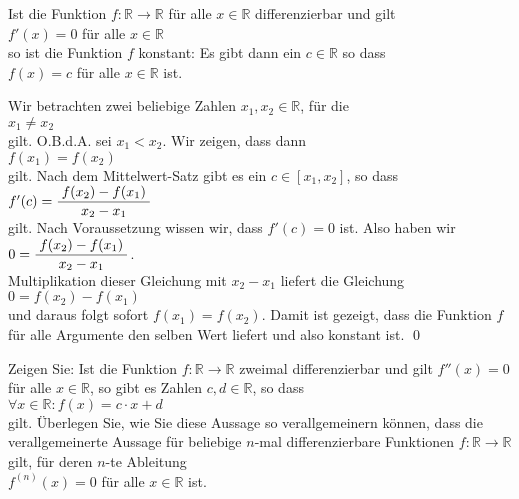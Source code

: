 \begin{Lemma} \label{lemma:0_ableitung}
Ist die Funktion $f:\mathbb{R} \rightarrow \mathbb{R}$ f\"ur alle $x \in \mathbb{R}$
differenzierbar und gilt
\\[0.2cm]
\hspace*{1.3cm}
$f'(x) = 0$ \quad f\"ur alle $x \in \mathbb{R}$
\\[0.2cm]
so ist die Funktion $f$ konstant:  Es gibt dann ein $c \in \mathbb{R}$ so dass
\\[0.2cm]
\hspace*{1.3cm}
$f(x) = c$ \quad f\"ur alle $x \in \mathbb{R}$ ist.
\end{Lemma}

\proof
Wir betrachten zwei beliebige Zahlen $x_1, x_2\in \mathbb{R}$, f\"ur die
\\[0.2cm]
\hspace*{1.3cm}
$x_1 \not= x_2$ 
\\[0.2cm]
gilt.  O.B.d.A. sei $x_1 < x_2$.  Wir zeigen, dass dann 
\\[0.2cm]
\hspace*{1.3cm}
$f(x_1) = f(x_2)$
\\[0.2cm]
gilt.  Nach dem Mittelwert-Satz gibt es ein $c \in [x_1,x_2]$, so dass
\\[0.2cm]
\hspace*{1.3cm}
$f'(c) = \displaystyle\frac{\;\displaystyle f(x_2) - f(x_1)\;}{\;\displaystyle x_2 - x_1\;}$ 
\\[0.2cm]
gilt.  Nach Voraussetzung wissen wir, dass $f'(c) = 0$ ist.  Also haben wir
\\[0.2cm]
\hspace*{1.3cm}
$0 = \displaystyle\frac{\;\displaystyle f(x_2) - f(x_1)\;}{\;\displaystyle x_2 - x_1\;}$.
\\[0.2cm]
Multiplikation dieser Gleichung mit $x_2 - x_1$ liefert die Gleichung
\\[0.2cm]
\hspace*{1.3cm}
$0 = f(x_2) - f(x_1)$
\\[0.2cm]
und daraus folgt sofort $f(x_1) = f(x_2)$.  Damit ist gezeigt, dass die Funktion $f$ f\"ur alle
Argumente den selben Wert liefert und also konstant ist. \qed

\exercise
Zeigen Sie: Ist die Funktion $f:\mathbb{R} \rightarrow \mathbb{R}$ zweimal differenzierbar und gilt
$f''(x) = 0$ f\"ur alle $x \in \mathbb{R}$, so gibt es Zahlen $c,d \in \mathbb{R}$, so dass 
\\[0.2cm]
\hspace*{1.3cm}
$\forall x \in \mathbb{R}: f(x) = c \cdot x + d$
\\[0.2cm]
gilt.  \"Uberlegen  Sie, wie Sie diese Aussage so verallgemeinern k\"onnen, dass die verallgemeinerte Aussage
f\"ur beliebige $n$-mal differenzierbare 
Funktionen $f:\mathbb{R} \rightarrow \mathbb{R}$ gilt, f\"ur deren $n$-te Ableitung 
\\[0.2cm]
\hspace*{1.3cm}
$f^{(n)}(x) = 0$ \quad f\"ur alle $x \in \mathbb{R}$ ist.  \eox



